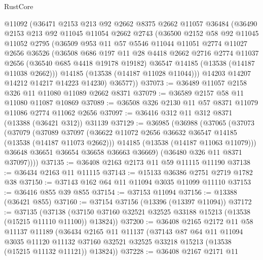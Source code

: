 \begin{lexlean}{RustCore}
\begin{coremodule}
    @11092
    (@36471
      @2153
      @213
      @92
      @2662
      @8375
      @2662
      @11057
      @36484
      (@36490
        @2153
        @213
        @92
        @11045
        @11054
        @2662
        @2743
        (@36500
          @2152
          @58
          @92
          @11045
          @11052
          @2795
          (@36509
            @953
            @11
            @57
            @5546
            @11044
            @11051
            @2774
            @11027
            @2656
            @36526
            (@36508
              @686
              @197
              @11
              @28
              @4418
              @2662
              @2716
              @2774
              @11037
              @2656
              (@36540 @685 @4418 @19178 @19182)
              @36547
              @14185
              (@13538 (@14187 @11038 @2662)))
            @14185
            (@13538 (@14187 @11028 @11044)))
          @14203
          @14207
          @14212
          @14217
          @14223
          @14230)
        @36577))
@37073 := @36489 @11057 @2158 @326 @11 @11080 @11089 @2662 @8371
@37079 := @36589 @2157 @58 @11 @11080 @11087 @10869
@37089 := @36508 @326 @2130 @11 @57 @8371 @11079 @11086 @2774 @11062 @2656
@37097 := @36416 @312 @11 @312 @8371 (@13388 (@36421 @312)) @31139
@37129 := @36985
    (@36988
      (@37065
        (@37073
          (@37079
            (@37089
              @37097
              (@36622 @11072 @2656 @36632 @36547 @14185 (@13538 (@14187 @11073 @2662)))
              @14185
              (@13538 (@14187 @11063 @11079)))
            @36648
            @36651
            @36654
            @36658
            @36663
            @36669)
          (@36480 @326 @11 @8371 @37097))))
@37135 := @36408 @2163 @2173 @11 @59 @11115 @11190
@37138 := @36434 @2163 @11 @11115
@37143 := @15133 @36386 @2751 @2719 @1782 @38
@37150 := @37143 @162 @64 @11 @11094 @3035 @11099 @11110
@37153 := @36416 @855 @39 @855
@37154 := @37153 @11094
@37156 := @13388 (@36421 @855)
@37160 := @37154 @37156 (@13396 (@13397 @11094))
@37172 := @37135
    (@37138 (@37150 @37160 @32521 @32525 @33188 @15213 (@13538 (@15215 @11110 @11100)) @13824))
@37200 := @36408
    @2165
    @2172
    @11
    @58
    @11137
    @11189
    (@36434
      @2165
      @11
      @11137
      (@37143
        @87
        @64
        @11
        @11094
        @3035
        @11120
        @11132
        @37160
        @32521
        @32525
        @33218
        @15213
        (@13538 (@15215 @11132 @11121))
        @13824))
@37228 := @36408
    @2167
    @2171
    @11

\end{coremodule}
\end{lexlean}
